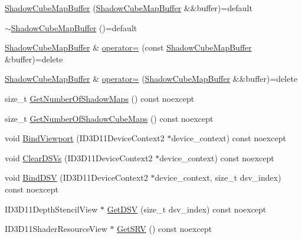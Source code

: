 \begin{DoxyCompactItemize}
\item 
\hyperlink{structmage_1_1_shadow_cube_map_buffer_af2e79caa3f372f164dc59982e3a94ff2}{Shadow\+Cube\+Map\+Buffer} (\hyperlink{structmage_1_1_shadow_cube_map_buffer}{Shadow\+Cube\+Map\+Buffer} \&\&buffer)=default
\item 
\hyperlink{structmage_1_1_shadow_cube_map_buffer_ad84dab42c8391819f93f9e60acd4655d}{$\sim$\+Shadow\+Cube\+Map\+Buffer} ()=default
\item 
\hyperlink{structmage_1_1_shadow_cube_map_buffer}{Shadow\+Cube\+Map\+Buffer} \& \hyperlink{structmage_1_1_shadow_cube_map_buffer_abdb46d337840a5ffd76f12472d520eff}{operator=} (const \hyperlink{structmage_1_1_shadow_cube_map_buffer}{Shadow\+Cube\+Map\+Buffer} \&buffer)=delete
\item 
\hyperlink{structmage_1_1_shadow_cube_map_buffer}{Shadow\+Cube\+Map\+Buffer} \& \hyperlink{structmage_1_1_shadow_cube_map_buffer_aebf8e9d2e0a2ec5bf13dc40b93f97fde}{operator=} (\hyperlink{structmage_1_1_shadow_cube_map_buffer}{Shadow\+Cube\+Map\+Buffer} \&\&buffer)=delete
\item 
size\+\_\+t \hyperlink{structmage_1_1_shadow_cube_map_buffer_a90dd93ff618bc56750bd08cfe6979c23}{Get\+Number\+Of\+Shadow\+Maps} () const noexcept
\item 
size\+\_\+t \hyperlink{structmage_1_1_shadow_cube_map_buffer_ab6832adb714a9685972ece7c410b38ad}{Get\+Number\+Of\+Shadow\+Cube\+Maps} () const noexcept
\item 
void \hyperlink{structmage_1_1_shadow_cube_map_buffer_abc8eb7d1ebf0cafb8b626bc5cc7c4c71}{Bind\+Viewport} (I\+D3\+D11\+Device\+Context2 $\ast$device\+\_\+context) const noexcept
\item 
void \hyperlink{structmage_1_1_shadow_cube_map_buffer_a302478177db8ed02a8fb610d308be9a1}{Clear\+D\+S\+Vs} (I\+D3\+D11\+Device\+Context2 $\ast$device\+\_\+context) const noexcept
\item 
void \hyperlink{structmage_1_1_shadow_cube_map_buffer_a67365d28537a2eda63d37b8cc5f2f0bd}{Bind\+D\+SV} (I\+D3\+D11\+Device\+Context2 $\ast$device\+\_\+context, size\+\_\+t dsv\+\_\+index) const noexcept
\item 
I\+D3\+D11\+Depth\+Stencil\+View $\ast$ \hyperlink{structmage_1_1_shadow_cube_map_buffer_a1db641015a14c177b4c504b85905060a}{Get\+D\+SV} (size\+\_\+t dsv\+\_\+index) const noexcept
\item 
I\+D3\+D11\+Shader\+Resource\+View $\ast$ \hyperlink{structmage_1_1_shadow_cube_map_buffer_ae1a6d1a26d482d6d145505b3b63bdb8d}{Get\+S\+RV} () const noexcept
\end{DoxyCompactItemize}
